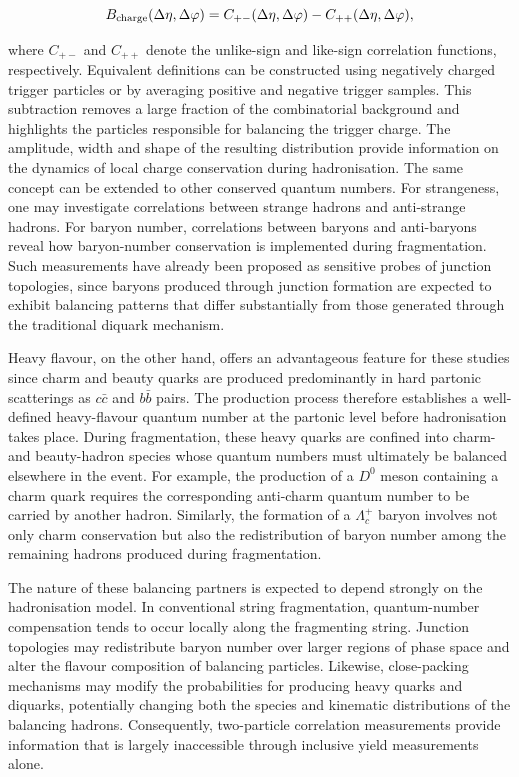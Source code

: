 \begin{equation}
B_{\rm charge}(\Delta\eta,\Delta\varphi) = 
C_{+-}(\Delta\eta,\Delta\varphi)-
C_{++}(\Delta\eta,\Delta\varphi),
\end{equation}

\noindent where $C_{+-}$ and $C_{++}$ denote the unlike-sign and like-sign correlation functions, respectively. Equivalent definitions can be constructed using negatively charged trigger particles or by averaging positive and negative trigger samples. This subtraction removes a large fraction of the combinatorial background and highlights the particles responsible for balancing the trigger charge. The amplitude, width and shape of the resulting distribution provide information on the dynamics of local charge conservation during hadronisation. The same concept can be extended to other conserved quantum numbers. For strangeness, one may investigate correlations between strange hadrons and anti-strange hadrons. For baryon number, correlations between baryons and anti-baryons reveal how baryon-number conservation is implemented during fragmentation. Such measurements have already been proposed as sensitive probes of junction topologies, since baryons produced through junction formation are expected to exhibit balancing patterns that differ substantially from those generated through the traditional diquark mechanism.

Heavy flavour, on the other hand, offers an advantageous feature for these studies since charm and beauty quarks are produced predominantly in hard partonic scatterings as $c\bar{c}$ and $b\bar{b}$ pairs. The production process therefore establishes a well-defined heavy-flavour quantum number at the partonic level before hadronisation takes place. During fragmentation, these heavy quarks are confined into charm- and beauty-hadron species whose quantum numbers must ultimately be balanced elsewhere in the event. For example, the production of a $D^0$ meson containing a charm quark requires the corresponding anti-charm quantum number to be carried by another hadron. Similarly, the formation of a $\Lambda_c^+$ baryon involves not only charm conservation but also the redistribution of baryon number among the remaining hadrons produced during fragmentation.

The nature of these balancing partners is expected to depend strongly on the hadronisation model. In conventional string fragmentation, quantum-number compensation tends to occur locally along the fragmenting string. Junction topologies may redistribute baryon number over larger regions of phase space and alter the flavour composition of balancing particles. Likewise, close-packing mechanisms may modify the probabilities for producing heavy quarks and diquarks, potentially changing both the species and kinematic distributions of the balancing hadrons. Consequently, two-particle correlation measurements provide information that is largely inaccessible through inclusive yield measurements alone.

